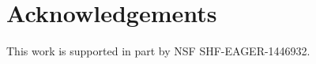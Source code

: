 
















\balance

\section*{Acknowledgements}
This work is supported in part by  NSF SHF-EAGER-1446932.


% 
% 

% 

